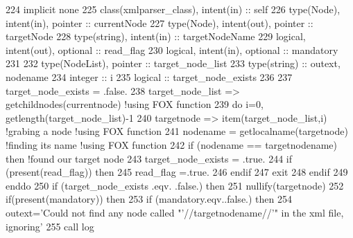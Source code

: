 \begin{DoxyCode}
224     \textcolor{keywordtype}{implicit none}
225     \textcolor{keywordtype}{class}(xmlparser\_class), \textcolor{keywordtype}{intent(in)} :: self
226     \textcolor{keywordtype}{type}(Node), \textcolor{keywordtype}{intent(in)}, \textcolor{keywordtype}{pointer} :: currentNode
227     \textcolor{keywordtype}{type}(Node), \textcolor{keywordtype}{intent(out)}, \textcolor{keywordtype}{pointer} :: targetNode
228     \textcolor{keywordtype}{type}(string), \textcolor{keywordtype}{intent(in)} :: targetNodeName
229     \textcolor{keywordtype}{logical}, \textcolor{keywordtype}{intent(out)}, \textcolor{keywordtype}{optional} :: read\_flag
230     \textcolor{keywordtype}{logical}, \textcolor{keywordtype}{intent(in)}, \textcolor{keywordtype}{optional} :: mandatory
231 
232     \textcolor{keywordtype}{type}(NodeList), \textcolor{keywordtype}{pointer} :: target\_node\_list
233     \textcolor{keywordtype}{type}(string) :: outext, nodename
234     \textcolor{keywordtype}{integer} :: i
235     \textcolor{keywordtype}{logical} :: target\_node\_exists
236 
237     target\_node\_exists = .false.
238     target\_node\_list => getchildnodes(currentnode) \textcolor{comment}{!using FOX function}
239     \textcolor{keywordflow}{do} i=0, getlength(target\_node\_list)-1
240         targetnode => item(target\_node\_list,i) \textcolor{comment}{!grabing a node !using FOX function}
241         nodename = getlocalname(targetnode)  \textcolor{comment}{!finding its name !using FOX function}
242         \textcolor{keywordflow}{if} (nodename == targetnodename) \textcolor{keywordflow}{then} \textcolor{comment}{!found our target node}
243             target\_node\_exists = .true.
244             \textcolor{keywordflow}{if} (\textcolor{keyword}{present}(read\_flag)) \textcolor{keywordflow}{then}
245                 read\_flag =.true.
246 \textcolor{keywordflow}{            endif}
247             \textcolor{keywordflow}{exit}
248 \textcolor{keywordflow}{        endif}
249 \textcolor{keywordflow}{    enddo}
250     \textcolor{keywordflow}{if} (target\_node\_exists .eqv. .false.) \textcolor{keywordflow}{then}
251         \textcolor{keyword}{nullify}(targetnode)
252         \textcolor{keywordflow}{if}(\textcolor{keyword}{present}(mandatory)) \textcolor{keywordflow}{then}
253             \textcolor{keywordflow}{if} (mandatory.eqv..false.) \textcolor{keywordflow}{then}
254                 outext=\textcolor{stringliteral}{'Could not find any node called "'}//targetnodename//\textcolor{stringliteral}{'" in the xml file, ignoring'}
255                 \textcolor{keyword}{call }log%

\end{DoxyCode}
